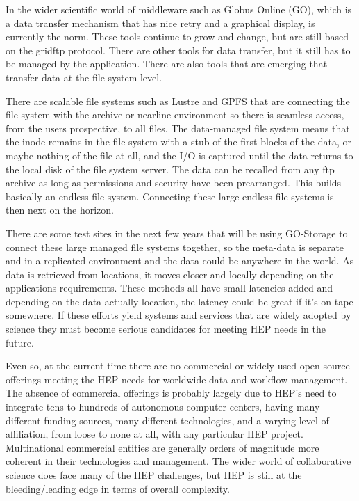 In the wider scientific world of middleware such as Globus Online (GO), which is 
a data transfer mechanism that has nice retry and a graphical display, is 
currently the norm.  These tools continue to grow and change, but are still 
based on the gridftp protocol.  There are other tools for data transfer, but 
it still has to be managed by the application.   There are  also tools that
are emerging that transfer data at the file system level.  

There are scalable file systems such as Lustre and GPFS that are connecting 
the file system with the archive or nearline environment so there is seamless
access, from the users prospective, to all files.  The data-managed file 
system means that the inode remains in the file system with a stub of the first 
blocks of the data, or maybe nothing of the file at all, and the I/O is captured 
until the data returns to the local disk of the file system server.   
The data can be recalled from any ftp archive as long as permissions and 
security have been prearranged.   This builds basically an endless file system.   
Connecting these large endless file systems is then next on the horizon.  

There are some test sites in the next few years that will be using GO-Storage 
to connect these large managed file systems together, so the meta-data is 
separate and in a replicated environment and the data could be anywhere in the 
world.  As data is retrieved from locations, it moves closer and locally 
depending on the applications requirements.   These methods all have small 
latencies added and depending on the data actually location, the latency could 
be great if it’s on tape somewhere.   If these efforts yield systems and services 
that are widely adopted by science they must become serious candidates for 
meeting HEP needs in the future.

Even so, at the current time there are no commercial or widely used open-source 
offerings meeting the HEP needs for worldwide data and workflow management.  
The absence of commercial offerings is probably largely due to HEP’s need to 
integrate tens to hundreds of autonomous computer centers, having many different 
funding sources, many different technologies, and a varying level of affiliation, 
from loose to none at all, with any particular HEP project.  Multinational commercial 
entities are generally orders of magnitude more coherent in their technologies and 
management.  The wider world of collaborative science does face many of the HEP 
challenges, but HEP is still at the bleeding/leading edge in terms of overall 
complexity.

